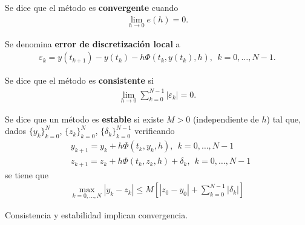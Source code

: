 \begin{defi}
Se dice que el método es \textbf{convergente} cuando
\begin{align*}
    \lim_{h \to 0} e(h) = 0.
\end{align*}
\end{defi}

\begin{defi}
Se denomina \textbf{error de discretización local} a
\begin{align*}
    \varepsilon_k = y(t_{k+1}) - y(t_k) - h\Phi(t_k,y(t_k),h), \ \ k = 0,\ldots,N-1.
\end{align*}
\end{defi}

\begin{defi}
    Se dice que el método es \textbf{consistente }si
    \begin{align*}
        \lim_{h \to 0} \sum_{k=0}^{N-1} |\varepsilon_k| = 0 .
    \end{align*}
\end{defi}

\begin{defi}
    Se dice que un método es \textbf{estable} si existe $M > 0$ (independiente de $h$) tal que, dados $\{y_k\}_{k=0}^{N}$, $\{z_k\}_{k=0}^{N}$, $\{\delta_k\}_{k=0}^{N-1}$ verificando
    \begin{align*}
        &y_{k+1} = y_k + h\Phi(t_k,y_k,h), \ \ k = 0,\ldots,N-1 \\
        &z_{k+1} = z_k + h\Phi(t_k,z_k,h) + \delta_k, \ \ k = 0,\ldots,N-1
    \end{align*}
    se tiene que
    \begin{align*}
        \max_{k=0,\ldots,N} |y_k - z_k| \leq M\left[ |z_0 - y_0| + \sum_{k=0}^{N-1} |\delta_k| \right]
    \end{align*}
\end{defi}

\begin{teo}
Consistencia y estabilidad implican convergencia.
\end{teo}

